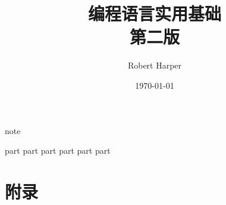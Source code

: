 \documentclass{ctexbook}
\title{{\Huge\textbf{编程语言实用基础}} \\第二版}
\author{Robert Harper}
\date{\today}
\begin{document}
\frontmatter
\maketitle

{note}

\setcounter{tocdepth}{1}
\tableofcontents

\newpage
\mainmatter

{part}
{part}
{part}
 {part}
 {part}
{part}

\backmatter
\part{附录}
\appendix
\printglossary[title=术语]
\end{document}
